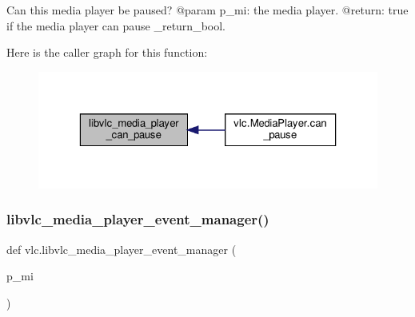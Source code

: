 \begin{DoxyVerb}Can this media player be paused?
@param p_mi: the media player.
@return: true if the media player can pause \libvlc_return_bool.
\end{DoxyVerb}
 Here is the caller graph for this function\+:
\nopagebreak
\begin{figure}[H]
\begin{center}
\leavevmode
\includegraphics[width=323pt]{namespacevlc_a175c3b4575fc50df873cc8efaa052522_icgraph}
\end{center}
\end{figure}
\mbox{\label{namespacevlc_a342f922c85a8846fd115bc0dfb1db186}} 
\subsubsection{\texorpdfstring{libvlc\+\_\+media\+\_\+player\+\_\+event\+\_\+manager()}{libvlc\_media\_player\_event\_manager()}}
{\footnotesize\ttfamily def vlc.\+libvlc\+\_\+media\+\_\+player\+\_\+event\+\_\+manager (\begin{DoxyParamCaption}\item[{}]{p\+\_\+mi }\end{DoxyParamCaption})}

